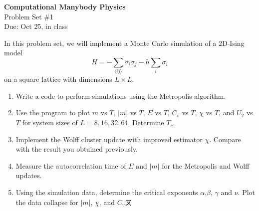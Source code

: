 \documentclass[12pt]{article}
\begin{document}
\begin{center}
\Large
\textbf{Computational Manybody Physics}\\
\large
Problem Set \#1\\
Due: Oct 25, in class

\end{center}
In this problem set, we will implement a Monte Carlo simulation of a 2D-Ising model
\[
H=-\sum_{\langle ij\rangle} \sigma_i \sigma_j - h \sum_{i} \sigma_i
\]
on a square lattice with dimensions $L\times L$. 
\begin{enumerate} 
\item Write a code to perform simulations using the Metropolis algorithm.
\item Use the program to plot $m$ vs $T$, $|m|$ vs $T$, $E$ vs $T$, $C_v$ vs $T$, $\chi$ vs $T$, and $U_2$ vs $T$  for system sizes of $L=8, 16, 32, 64$. Determine $T_c$.  
\item Implement the Wolff cluster update with improved estimator $\chi$. Compare with the result you obtained previously.
\item  Measure the autocorrelation time of $E$ and $|m|$ for the Metropolis and Wolff updates.
\item Using the simulation data, determine the critical exponents $\alpha$,$\beta$,  $\gamma$ and $\nu$. Plot the data collapse for $|m|$, $\chi$, and $C_v$ㄡ
\end{enumerate}
\end{document}
